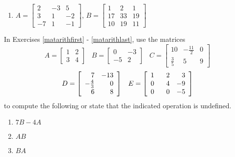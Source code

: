 \begin{enumerate}
\setcounter{enumi}{\value{HW}}

\item  $ A = \left[ \begin{array}{rrr} 2 & -3 & 5 \\ 3 & 1 &-2 \\ -7 & 1 & -1 \end{array} \right]$, $B= \left[ \begin{array}{rrr} 1 & 2 & 1 \\ 17 & 33 & 19 \\ 10 & 19 & 11 \end{array} \right]$ \label{easymatarithlast}

\setcounter{HW}{\value{enumi}}
\end{enumerate}


In Exercises \ref{matarithfirst} - \ref{matarithlast}, use the matrices \[A = \left[ \begin{array}{rr} 1 & 2 \\ 3 & 4 \end{array} \right] \;\;\; B = \left[ \begin{array}{rr} 0 & -3 \\ -5 & 2 \end{array} \right] \;\;\; C = \left[ \begin{array}{rrr} 10 & -\frac{11}{2} & 0 \\ \frac{3}{5} & 5 & 9 \end{array} \right]\] \[ D = \left[ \begin{array}{rr} 7 & -13 \\ -\frac{4}{3} & 0 \\ 6 & 8 \end{array} \right] \;\;\; E = \left[ \begin{array}{rrr} 1 & \hphantom{-}2 & 3 \\ 0 & 4 & -9 \\ 0 & 0 & -5 \end{array} \right] \] to compute the following or state that the indicated operation is undefined.

\begin{multicols}{3} 
\begin{enumerate}
\setcounter{enumi}{\value{HW}}

\item $7B - 4A$  \label{matarithfirst}
\item $AB$
\item $BA$

\setcounter{HW}{\value{enumi}}
\end{enumerate}
\end{multicols}

